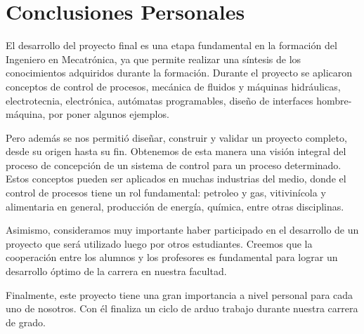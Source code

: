 \section{Conclusiones Personales}
\label{sec:ConclusionPersonal}


El desarrollo del proyecto final es una etapa fundamental en la formación del
Ingeniero en Mecatrónica, ya que permite realizar una síntesis de los
conocimientos adquiridos durante la formación.
Durante el proyecto se aplicaron conceptos de control de
procesos, mecánica de fluidos y máquinas hidráulicas, electrotecnia,
electrónica, autómatas programables, diseño de interfaces hombre-máquina, por 
poner algunos ejemplos.

Pero además se nos permitió diseñar, construir y validar un proyecto completo,
desde su origen hasta su fin.
Obtenemos de esta manera una visión integral del proceso de concepción de un
sistema de control para un proceso determinado.
Estos conceptos pueden ser aplicados en muchas industrias del medio, donde el
control de procesos tiene un rol fundamental: petroleo y gas, vitivinícola y
alimentaria en general, producción de energía, química, entre otras disciplinas.

Asimismo, consideramos muy importante haber participado en el desarrollo de un
proyecto que será utilizado luego por otros estudiantes.
Creemos que la cooperación entre los alumnos y los profesores es fundamental
para lograr un desarrollo óptimo de la carrera en nuestra facultad.

Finalmente, este proyecto tiene una gran importancia a nivel personal para cada
uno de nosotros.
Con él finaliza un ciclo de arduo trabajo durante nuestra
carrera de grado.
